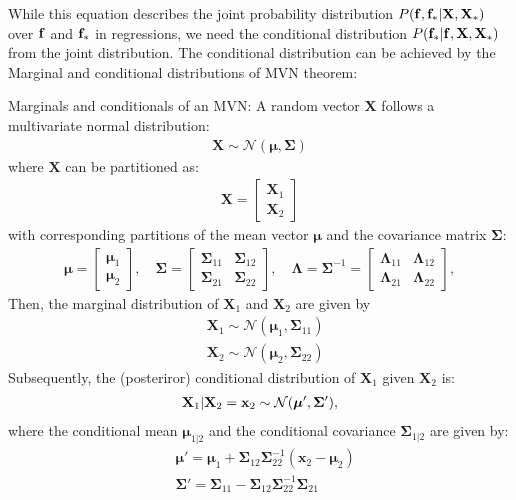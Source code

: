 While this equation describes the joint probability distribution $P({\mathbf{f}}, {\mathbf{f}}_*|\mathbf{X}, \mathbf{X}_*)$ over ${\mathbf{f}}$ and ${\mathbf{f}}_*$ in regressions, we need the conditional distribution $P({\mathbf{f}}_*|{\mathbf{f}}, \mathbf{X}, \mathbf{X}_*)$ from the joint distribution. The conditional distribution can be achieved by the Marginal and conditional distributions of MVN theorem:

\begin{theorem} Marginals and conditionals of an MVN:
A random vector $\mathbf{X}$ follows a multivariate normal distribution:
\begin{align*}
	\mathbf{X} \sim \mathcal{N}(\boldsymbol{\mu}, \mathbf{\Sigma})
\end{align*}
where $\mathbf{X}$ can be partitioned as:
\begin{align*}
	\mathbf{X} = \begin{bmatrix}
	\mathbf{X}_1 \\
	\mathbf{X}_2
	\end{bmatrix}
\end{align*}
with corresponding partitions of the mean vector $\boldsymbol{\mu}$ and the covariance matrix \(\mathbf{\Sigma}\):
\begin{align*}
\boldsymbol{\mu} = \begin{bmatrix}
\boldsymbol{\mu}_1 \\
\boldsymbol{\mu}_2
\end{bmatrix}, \quad
\mathbf{\Sigma} = \begin{bmatrix}
\mathbf{\Sigma}_{11} & \mathbf{\Sigma}_{12} \\
\mathbf{\Sigma}_{21} & \mathbf{\Sigma}_{22}
\end{bmatrix},\quad
\mathbf{\Lambda} = \mathbf{\Sigma}^{-1} = \begin{bmatrix}
\mathbf{\Lambda}_{11} & \mathbf{\Lambda}_{12} \\
\mathbf{\Lambda}_{21} & \mathbf{\Lambda}_{22}
\end{bmatrix},
\end{align*}
Then, the marginal distribution of $\mathbf{X}_1$ and $\mathbf{X}_2$ are given by
\begin{align*}
	&\mathbf{X}_1 \sim \mathcal{N}(\boldsymbol{\mu}_1, \mathbf{\Sigma}_{11})\\
	&\mathbf{X}_2 \sim \mathcal{N}(\boldsymbol{\mu}_2, \mathbf{\Sigma}_{22})
\end{align*}
Subsequently, the (posteriror) conditional distribution of $\mathbf{X}_1$ given $\mathbf{X}_2$ is:
\begin{align*}
	\mathbf{X}_1 | \mathbf{X}_2 = {\mathbf{x}}_2\sim \mathcal{N}(\boldsymbol{\mu}', \mathbf{\Sigma}'),
\end{align*}
where the conditional mean \(\boldsymbol{\mu}_{1|2}\) and the conditional covariance \(\mathbf{\Sigma}_{1|2}\) are given by:
\begin{align*}
	&\boldsymbol{\mu}' = \boldsymbol{\mu}_1 + \mathbf{\Sigma}_{12}\mathbf{\Sigma}_{22}^{-1} (\mathbf{x}_2 - \boldsymbol{\mu}_2)\\
	&\mathbf{\Sigma}' = \mathbf{\Sigma}_{11} - \mathbf{\Sigma}_{12}\mathbf{\Sigma}_{22}^{-1}\mathbf{\Sigma}_{21}
\end{align*}
\end{theorem}

